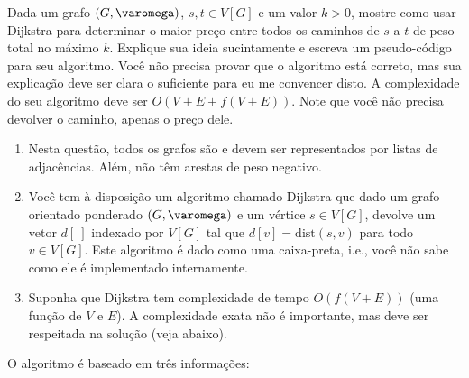 Dada um grafo $(G, \varomega)$, $s, t \in V[G]$ e um valor $k > 0$, mostre como usar Dijkstra para determinar o maior preço entre todos os caminhos de $s$ a $t$ de peso total no máximo $k$. Explique sua ideia sucintamente e escreva um pseudo-código para seu algoritmo. Você não  precisa provar que o algoritmo está correto, mas sua explicação deve ser clara o suficiente para eu me convencer disto. A complexidade do seu algoritmo deve ser $O(V+E + f(V+E))$. Note que você não precisa devolver o caminho, apenas o preço dele.

\begin{enumerate}[label={(\alph*)}]
    \item Nesta questão, todos os grafos são e devem ser representados por listas de adjacências. Além, não têm arestas de peso negativo.

    \item Você tem à disposição um algoritmo chamado Dijkstra que dado um grafo orientado ponderado $(G, \varomega)$ e um vértice $s \in V[G]$, devolve um vetor $d[~]$ indexado por $V[G]$ tal que $d[v] = \mathrm{dist}(s, v)$ para todo $v \in V[G]$. Este algoritmo é dado como uma caixa-preta, i.e., você não sabe como ele é implementado internamente.

    \item Suponha que Dijkstra tem complexidade de tempo $O(f(V+E))$ (uma função de $V$ e $E$). A complexidade exata não é importante, mas deve ser respeitada na solução (veja abaixo).
\end{enumerate}

\itemdsep

O algoritmo é baseado em três informações:

%         



